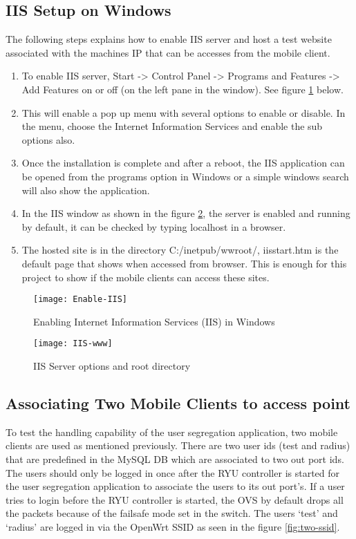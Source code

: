 \subsection{IIS Setup on Windows}
The following steps explains how to enable IIS server and host a test website associated with the machines IP that can be accesses from the mobile client.

\begin{enumerate}
	\item To enable IIS server, Start -> Control Panel -> Programs and Features -> Add Features on or off (on the left pane in the window). See figure \ref{fig:enable_iis} below.
	\item This will enable a pop up menu with several options to enable or disable. In the menu, choose the Internet Information Services and enable the sub options also.
	\item Once the installation is complete and after a reboot, the IIS application can be opened from the programs option in Windows or a simple windows search will also show the application.
	\item In the IIS window as shown in the figure \ref{fig:iis-www}, the server is enabled and running by default, it can be checked by typing localhost in a browser.
	\item The hosted site is in the directory C:/inetpub/wwroot/, iisstart.htm is the default page that shows when accessed from browser. This is enough for this project to show if the mobile clients can access these sites.
	
\end{enumerate}
  \begin{figure}
	\centering
	\texttt{[image: Enable-IIS]}
	\caption {Enabling Internet Information Services (IIS) in Windows}
	\label{fig:enable_iis}
	\vspace{-10pt}
  \end{figure}
  \begin{figure}
	\centering
	\texttt{[image: IIS-www]}
	\caption {IIS Server options and root directory}
	\label{fig:iis-www}
	\vspace{-10pt}
  \end{figure}
\subsection{Associating Two Mobile Clients to access point}
To test the handling capability of the user segregation application, two mobile clients are used as mentioned previously. There are two user ids (test and radius) that are predefined in the MySQL DB which are associated to two out port ids. The users should only be logged in once after the RYU controller is started for the user segregation application to associate the users to its out port’s. If a user tries to login before the RYU controller is started, the OVS by default drops all the packets because of the failsafe mode set in the switch. The users ‘test’ and ‘radius’ are logged in via the OpenWrt SSID as seen in the figure \ref{fig:two-ssid}.
